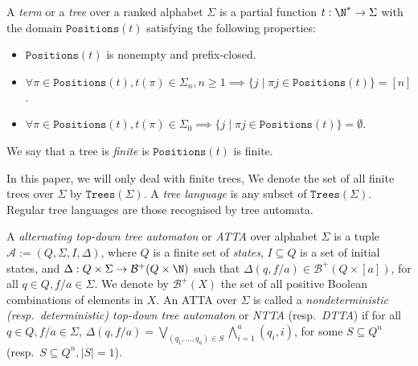 \documentclass[12pt, a4paper]{article}
\newcommand{\B}{\mathcal{B}}
\newcommand{\tsig}{\Trees{\Alphabet}}
\newcommand{\Alphabet}{\ensuremath{\Sigma}}
\newcommand{\Trees}[1]{\ensuremath{\texttt{Trees}\left(#1\right)}}
\newcommand{\Positions}{\texttt{Positions}}
\newcommand{\Transitions}{\ensuremath{\Delta}}
\newcommand{\automaton}{\ensuremath{\mathcal{A}}}
\begin{document}
\begin{definition}\label{def:tree}
	A \emph{term} or a \emph{tree} over a ranked alphabet $\Alphabet$ is a partial function $t : \N^* \to \Alphabet$ with the domain $\Positions(t)$ satisfying the following properties:
	\begin{itemize}
		\item $\Positions(t)$ is nonempty and prefix-closed.
		\item $\forall \pi \in \Positions(t), t(\pi) \in \Alphabet_n, n \geq 1 \implies \{j \mid \pi j \in \Positions(t)\} = [n]$.
		\item $\forall \pi \in \Positions(t), t(\pi) \in \Alphabet_0 \implies \{j \mid \pi j \in \Positions(t)\} = \emptyset$.
	\end{itemize}
	We say that a tree is \emph{finite} is $\Positions(t)$ is finite.
\end{definition}
In this paper, we will only deal with finite trees, We denote the set of all finite trees over $\Alphabet$ by $\tsig$. A \emph{tree language} is any subset of $\tsig$. Regular tree languages are those recognised by tree automata.

\begin{definition}\label{def:alternatingTreeAutomaton}
    A \emph{alternating top-down tree automaton} or \emph{ATTA} over alphabet $\Alphabet$ is a tuple $\automaton := (Q, \Alphabet, I, \Transitions)$, where $Q$ is a finite set of \emph{states}, $I \subseteq Q$ is a set of initial states, and $\Transitions : Q \times \Alphabet \to \B^+(Q \times \N)$ such that $\Transitions(q, f/a) \in \B^+(Q \times [a])$, for all $q \in Q, f/a \in \Alphabet$. We denote by $\B^+(X)$ the set of all positive Boolean combinations of elements in $X$. An ATTA over $\Alphabet$ is called a \emph{nondeterministic (resp.~deterministic) top-down tree automaton} or \emph{NTTA} (resp.~\emph{DTTA}) if for all $q \in Q, f/a \in \Alphabet$, $\Transitions(q, f/a) = \bigvee_{(q_1, \dots, q_a) \in S} \bigwedge_{i=1}^{a} (q_i, i)$, for some $S \subseteq Q^n$ (resp.~$S \subseteq Q^n, |S| = 1$).
\end{definition}
\end{document}
